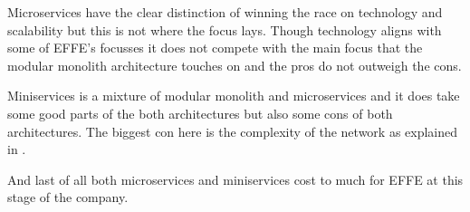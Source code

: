 Microservices have the clear distinction of winning the race on technology and scalability but this is not where the focus lays. Though technology aligns with some of EFFE's focusses it does not compete with the main focus that the modular monolith architecture touches on and the pros do not outweigh the cons.

Miniservices is a mixture of modular monolith and microservices and it does take some good parts of the both architectures but also some cons of both architectures. The biggest con here is the complexity of the network as explained in .

And last of all both microservices and miniservices cost to much for EFFE at this stage of the company.
